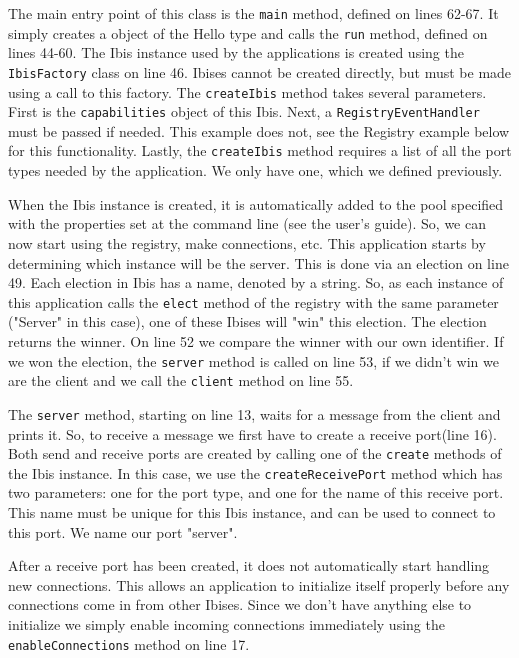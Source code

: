 The main entry point of this class is the \texttt{main} method, defined
on lines 62-67. It simply creates a object of the Hello type and calls
the \texttt{run} method, defined on lines 44-60. The Ibis instance used
by the applications is created using the \texttt{IbisFactory} class on
line 46. Ibises cannot be created directly, but must be made using a
call to this factory. The \texttt{createIbis} method takes several
parameters. First is the \texttt{capabilities} object of this Ibis.
Next, a \texttt{RegistryEventHandler} must be passed if needed. This
example does not, see the Registry example below for this functionality.
Lastly, the \texttt{createIbis} method requires a list of all the port
types needed by the application. We only have one, which we defined
previously.

When the Ibis instance is created, it is automatically added to the pool
specified with the properties set at the command line (see the
user's guide). So, we can now start using the registry, make
connections, etc. This application starts by determining which instance
will be the server. This is done via an election on line 49. Each
election in Ibis has a name, denoted by a string. So, as each instance
of this application calls the \texttt{elect} method of the registry with
the same parameter ("Server" in this case), one of these Ibises will
"win" this election. The election returns the winner. On line 52 we
compare the winner with our own identifier. If we won the election, the
\texttt{server} method is called on line 53, if we didn't win we are the
client and we call the \texttt{client} method on line 55.

The \texttt{server} method, starting on line 13, waits for a message
from the client and prints it. So, to receive a message we first have to
create a receive port(line 16). Both send and receive ports are created
by calling one of the \texttt{create} methods of the Ibis instance. In
this case, we use the \texttt{createReceivePort} method which has two
parameters: one for the port type, and one for the name of this
receive port. This name must be unique for this Ibis instance, and can
be used to connect to this port. We name our port "server".

After a receive port has been created, it does not automatically start
handling new connections. This allows an application to initialize
itself properly before any connections come in from other Ibises. Since
we don't have anything else to initialize we simply enable incoming
connections immediately using the \texttt{enableConnections} method on
line 17.


